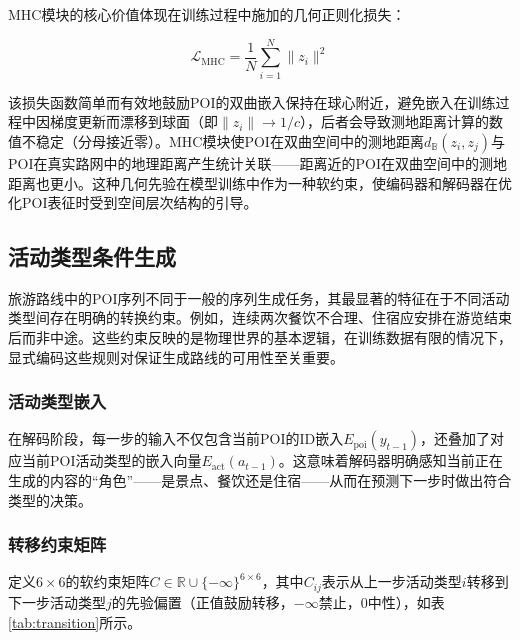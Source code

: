 \documentclass[12pt,a4paper]{ctexart}
\begin{document}
MHC模块的核心价值体现在训练过程中施加的几何正则化损失：

\begin{equation}
\mathcal{L}_{\text{MHC}} = \frac{1}{N}\sum_{i=1}^{N}\|z_i\|^2
\label{eq:mhc_reg}
\end{equation}

该损失函数简单而有效地鼓励POI的双曲嵌入保持在球心附近，避免嵌入在训练过程中因梯度更新而漂移到球面（即$\|z_i\|\to 1/c$），后者会导致测地距离计算的数值不稳定（分母接近零）。MHC模块使POI在双曲空间中的测地距离$d_{\mathbb{B}}(z_i,z_j)$与POI在真实路网中的地理距离产生统计关联——距离近的POI在双曲空间中的测地距离也更小。这种几何先验在模型训练中作为一种软约束，使编码器和解码器在优化POI表征时受到空间层次结构的引导。

\subsection{活动类型条件生成}

旅游路线中的POI序列不同于一般的序列生成任务，其最显著的特征在于不同活动类型间存在明确的转换约束。例如，连续两次餐饮不合理、住宿应安排在游览结束后而非中途。这些约束反映的是物理世界的基本逻辑，在训练数据有限的情况下，显式编码这些规则对保证生成路线的可用性至关重要。

\subsubsection{活动类型嵌入}

在解码阶段，每一步的输入不仅包含当前POI的ID嵌入$E_{\text{poi}}(y_{t-1})$，还叠加了对应当前POI活动类型的嵌入向量$E_{\text{act}}(a_{t-1})$。这意味着解码器明确感知当前正在生成的内容的“角色”——是景点、餐饮还是住宿——从而在预测下一步时做出符合类型的决策。

\subsubsection{转移约束矩阵}

定义$6\times6$的软约束矩阵$C\in\mathbb{R}\cup\{-\infty\}^{6\times6}$，其中$C_{ij}$表示从上一步活动类型$i$转移到下一步活动类型$j$的先验偏置（正值鼓励转移，$-\infty$禁止，0中性），如表\ref{tab:transition}所示。
\end{document}
